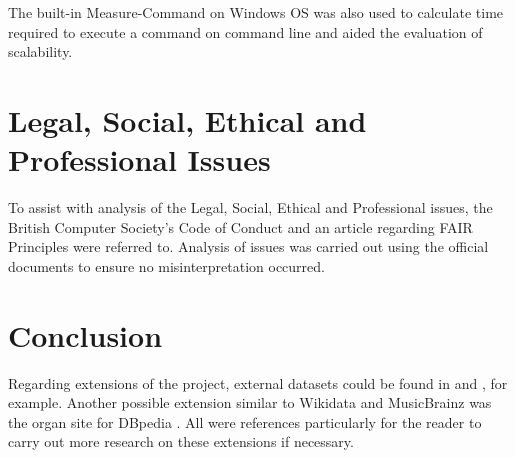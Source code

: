 The built-in Measure-Command \cite{measurecommand} on Windows OS was also used to calculate time required to execute a command on command line and aided the evaluation of scalability. 

\section{Legal, Social, Ethical and Professional Issues}
\hspace{0.5cm} To assist with analysis of the Legal, Social, Ethical and Professional issues, the British Computer Society's Code of Conduct \cite{bcs} and an article regarding FAIR Principles \cite{fairprinciples} were referred to. Analysis of issues was carried out using the official documents to ensure no misinterpretation occurred. 

\section{Conclusion}
\hspace{0.5cm} Regarding extensions of the project, external datasets could be found in \cite{kaggle} and \cite{googledatasetsearch}, for example. Another possible extension similar to Wikidata and MusicBrainz was the organ site for DBpedia \cite{organdbpedia}. All were references particularly for the reader to carry out more research on these extensions if necessary. 